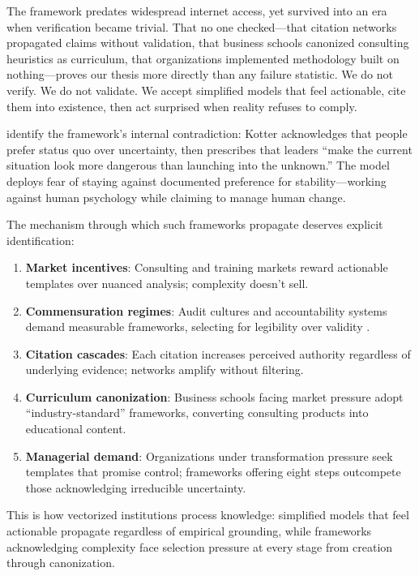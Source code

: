 The framework predates widespread internet access, yet survived into an era when verification became trivial. That no one checked—that citation networks propagated claims without validation, that business schools canonized consulting heuristics as curriculum, that organizations implemented methodology built on nothing—proves our thesis more directly than any failure statistic. We do not verify. We do not validate. We accept simplified models that feel actionable, cite them into existence, then act surprised when reality refuses to comply.

\citet{mclaren2023} identify the framework's internal contradiction: Kotter acknowledges that people prefer status quo over uncertainty, then prescribes that leaders ``make the current situation look more dangerous than launching into the unknown.'' The model deploys fear of staying against documented preference for stability—working against human psychology while claiming to manage human change.

The mechanism through which such frameworks propagate deserves explicit identification:
\begin{enumerate}
\item \textbf{Market incentives}: Consulting and training markets reward actionable templates over nuanced analysis; complexity doesn't sell.
\item \textbf{Commensuration regimes}: Audit cultures and accountability systems demand measurable frameworks, selecting for legibility over validity \citep{espeland1998}.
\item \textbf{Citation cascades}: Each citation increases perceived authority regardless of underlying evidence; networks amplify without filtering.
\item \textbf{Curriculum canonization}: Business schools facing market pressure adopt ``industry-standard'' frameworks, converting consulting products into educational content.
\item \textbf{Managerial demand}: Organizations under transformation pressure seek templates that promise control; frameworks offering eight steps outcompete those acknowledging irreducible uncertainty.
\end{enumerate}

This is how vectorized institutions process knowledge: simplified models that feel actionable propagate regardless of empirical grounding, while frameworks acknowledging complexity face selection pressure at every stage from creation through canonization.

